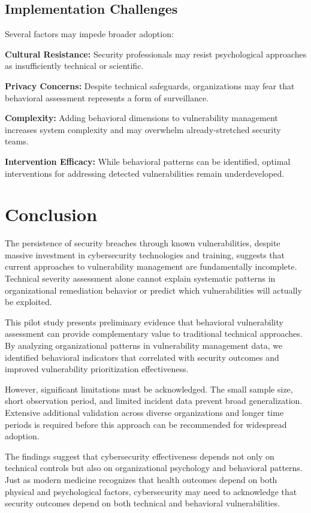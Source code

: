 \documentclass[10pt, twocolumn]{article}
\begin{document}
\subsection{Implementation Challenges}

Several factors may impede broader adoption:

\textbf{Cultural Resistance:} Security professionals may resist psychological approaches as insufficiently technical or scientific.

\textbf{Privacy Concerns:} Despite technical safeguards, organizations may fear that behavioral assessment represents a form of surveillance.

\textbf{Complexity:} Adding behavioral dimensions to vulnerability management increases system complexity and may overwhelm already-stretched security teams.

\textbf{Intervention Efficacy:} While behavioral patterns can be identified, optimal interventions for addressing detected vulnerabilities remain underdeveloped.

\section{Conclusion}

The persistence of security breaches through known vulnerabilities, despite massive investment in cybersecurity technologies and training, suggests that current approaches to vulnerability management are fundamentally incomplete. Technical severity assessment alone cannot explain systematic patterns in organizational remediation behavior or predict which vulnerabilities will actually be exploited.

This pilot study presents preliminary evidence that behavioral vulnerability assessment can provide complementary value to traditional technical approaches. By analyzing organizational patterns in vulnerability management data, we identified behavioral indicators that correlated with security outcomes and improved vulnerability prioritization effectiveness.

However, significant limitations must be acknowledged. The small sample size, short observation period, and limited incident data prevent broad generalization. Extensive additional validation across diverse organizations and longer time periods is required before this approach can be recommended for widespread adoption.

The findings suggest that cybersecurity effectiveness depends not only on technical controls but also on organizational psychology and behavioral patterns. Just as modern medicine recognizes that health outcomes depend on both physical and psychological factors, cybersecurity may need to acknowledge that security outcomes depend on both technical and behavioral vulnerabilities.
\end{document}
